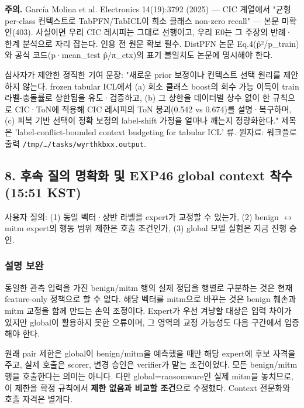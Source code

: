 \textbf{주의.} García Molina et al. Electronics 14(19):3792 (2025) — CIC 계열에서 "균형 per-class 컨텍스트로 TabPFN/\allowbreak{}TabICL이 희소 클래스 non-zero recall" — 본문 미확인(403). 사실이면 우리 CIC 레시피는 그대로 선행이고, 우리 E0는 그 주장의 반례·한계 분석으로 자리 잡는다. 인용 전 원문 확보 필수. DistPFN 논문 Eq.4(p̂²/\allowbreak{}p\_\allowbreak{}train)와 공식 코드(p·mean\_\allowbreak{}test p̂/\allowbreak{}π\_\allowbreak{}ctx)의 표기 불일치도 논문에 명시해야 한다.

심사자가 제안한 정직한 기여 문장: "새로운 prior 보정이나 컨텍스트 선택 원리를 제안하지 않는다. frozen tabular ICL에서 (a) 희소 클래스 boost의 회수 가능 이득이 train 라벨-충돌률로 상한됨을 유도·검증하고, (b) 그 상한을 데이터별 상수 없이 한 규칙으로 CIC·ToN에 적용해 CIC 레시피의 ToN 붕괴(0.542 vs 0.674)를 설명·복구하며, (c) 피복 기반 선택이 정확 보정의 label-shift 가정을 얼마나 깨는지 정량화한다." 제목은 'label-conflict-bounded context budgeting for tabular ICL' 류. 원자료: 워크플로 출력 \texttt{/\allowbreak{}\allowbreak{}tmp/\allowbreak{}\allowbreak{}…/\allowbreak{}\allowbreak{}t\allowbreak{}asks/\allowbreak{}\allowbreak{}wyr\allowbreak{}thkbxx.\allowbreak{}o\allowbreak{}utput}.

\subsection{8. 후속 질의 명확화 및 EXP46 global context 착수 (15:51 KST)}
사용자 질의: (1) 동일 벡터·상반 라벨을 expert가 교정할 수 있는가, (2) benign \ensuremath{\leftrightarrow} mitm expert의 행동 범위 제한은 호출 조건인가, (3) global 모델 실험은 지금 진행 승인.

\subsubsection{설명 보완}
\par\noindent \textbullet\enspace 동일한 관측 입력을 가진 benign/\allowbreak{}mitm 행의 실제 정답을 행별로 구분하는 것은 현재 feature-only 정책으로 할 수 없다. 해당 벡터를 mitm으로 바꾸는 것은 benign 훼손과 mitm 교정을 함께 만드는 손익 조정이다. Expert가 우선 겨냥할 대상은 입력 차이가 있지만 global이 활용하지 못한 오류이며, 그 영역의 교정 가능성도 다음 구간에서 입증해야 한다.


\par\noindent \textbullet\enspace 원래 pair 제한은 global이 benign/\allowbreak{}mitm을 예측했을 때만 해당 expert에 후보 자격을 주고, 실제 호출은 scorer, 변경 승인은 verifier가 맡는 조건이었다. 모든 benign/\allowbreak{}mitm 행을 호출한다는 의미는 아니다. 다만 global=\allowbreak{}ransomware인 실제 mitm을 놓치므로, 이 제한을 확정 규칙에서 \textbf{제한 없음과 비교할 조건}으로 수정했다. Context 전문화와 호출 자격은 별개다.



